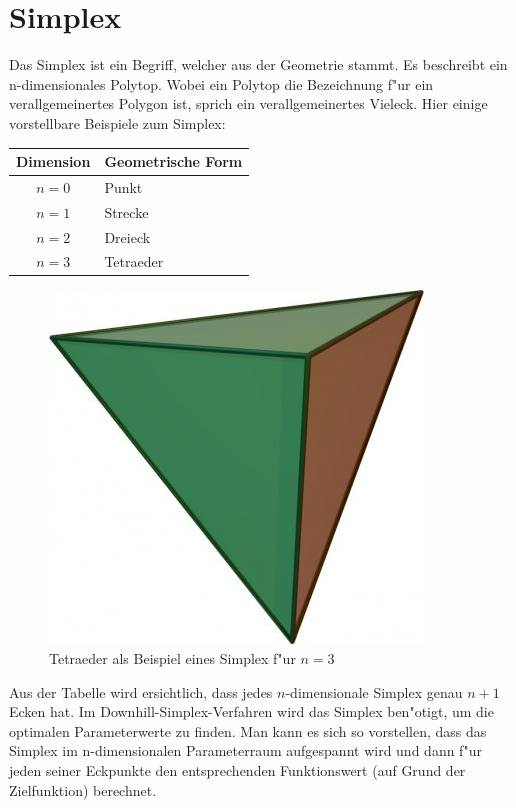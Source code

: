 \section{Simplex}
Das Simplex ist ein Begriff, welcher aus der Geometrie stammt. Es beschreibt ein n-dimensionales Polytop. Wobei ein Polytop die Bezeichnung f"ur ein verallgemeinertes Polygon ist, sprich ein verallgemeinertes Vieleck. 
Hier einige vorstellbare Beispiele zum Simplex:
 
\begin{tabular}{c|l}
Dimension & Geometrische Form\\
\hline
$n=0$ & Punkt\\
$n=1$ & Strecke\\
$n=2$ & Dreieck\\
$n=3$ & Tetraeder
\end{tabular}

\begin{figure}
\centering
\includegraphics[height=0.25\textwidth]{downhill/tetraeder.jpg}
\caption{Tetraeder als Beispiel eines Simplex f"ur $n=3$}
\end{figure}

Aus der Tabelle wird ersichtlich, dass jedes $n$-dimensionale Simplex genau $n+1$ Ecken hat.
Im Downhill-Simplex-Verfahren wird das Simplex ben"otigt, um die optimalen Parameterwerte zu finden. Man kann es sich so vorstellen, dass das Simplex im n-dimensionalen Parameterraum aufgespannt wird und dann f"ur jeden seiner Eckpunkte den entsprechenden Funktionswert (auf Grund der Zielfunktion) berechnet.
